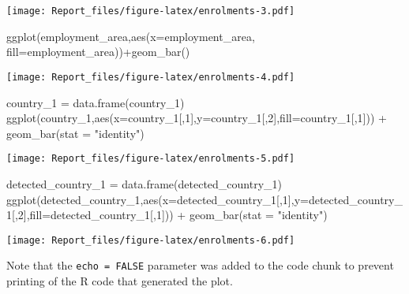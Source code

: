 \documentclass[
]{article}
\newenvironment{Shaded}{\begin{snugshade}}{\end{snugshade}}
\newcommand{\AttributeTok}[1]{\textcolor[rgb]{0.77,0.63,0.00}{#1}}
\newcommand{\DecValTok}[1]{\textcolor[rgb]{0.00,0.00,0.81}{#1}}
\newcommand{\FunctionTok}[1]{\textcolor[rgb]{0.00,0.00,0.00}{#1}}
\newcommand{\NormalTok}[1]{#1}
\newcommand{\OtherTok}[1]{\textcolor[rgb]{0.56,0.35,0.01}{#1}}
\newcommand{\SpecialCharTok}[1]{\textcolor[rgb]{0.00,0.00,0.00}{#1}}
\newcommand{\StringTok}[1]{\textcolor[rgb]{0.31,0.60,0.02}{#1}}
\begin{document}
\texttt{[image: Report\_files/figure-latex/enrolments-3.pdf]}

\begin{Shaded}
\begin{Highlighting}[]
\FunctionTok{ggplot}\NormalTok{(employment\_area,}\FunctionTok{aes}\NormalTok{(}\AttributeTok{x=}\NormalTok{employment\_area, }\AttributeTok{fill=}\NormalTok{employment\_area))}\SpecialCharTok{+}\FunctionTok{geom\_bar}\NormalTok{()}
\end{Highlighting}
\end{Shaded}

\texttt{[image: Report\_files/figure-latex/enrolments-4.pdf]}

\begin{Shaded}
\begin{Highlighting}[]
\NormalTok{country\_1 }\OtherTok{=} \FunctionTok{data.frame}\NormalTok{(country\_1)}
\FunctionTok{ggplot}\NormalTok{(country\_1,}\FunctionTok{aes}\NormalTok{(}\AttributeTok{x=}\NormalTok{country\_1[,}\DecValTok{1}\NormalTok{],}\AttributeTok{y=}\NormalTok{country\_1[,}\DecValTok{2}\NormalTok{],}\AttributeTok{fill=}\NormalTok{country\_1[,}\DecValTok{1}\NormalTok{])) }\SpecialCharTok{+}
  \FunctionTok{geom\_bar}\NormalTok{(}\AttributeTok{stat =} \StringTok{"identity"}\NormalTok{)}
\end{Highlighting}
\end{Shaded}

\texttt{[image: Report\_files/figure-latex/enrolments-5.pdf]}

\begin{Shaded}
\begin{Highlighting}[]
\NormalTok{detected\_country\_1 }\OtherTok{=} \FunctionTok{data.frame}\NormalTok{(detected\_country\_1)}
\FunctionTok{ggplot}\NormalTok{(detected\_country\_1,}\FunctionTok{aes}\NormalTok{(}\AttributeTok{x=}\NormalTok{detected\_country\_1[,}\DecValTok{1}\NormalTok{],}\AttributeTok{y=}\NormalTok{detected\_country\_1[,}\DecValTok{2}\NormalTok{],}\AttributeTok{fill=}\NormalTok{detected\_country\_1[,}\DecValTok{1}\NormalTok{])) }\SpecialCharTok{+}
  \FunctionTok{geom\_bar}\NormalTok{(}\AttributeTok{stat =} \StringTok{"identity"}\NormalTok{)}
\end{Highlighting}
\end{Shaded}

\texttt{[image: Report\_files/figure-latex/enrolments-6.pdf]}

Note that the \texttt{echo\ =\ FALSE} parameter was added to the code
chunk to prevent printing of the R code that generated the plot.
\end{document}

